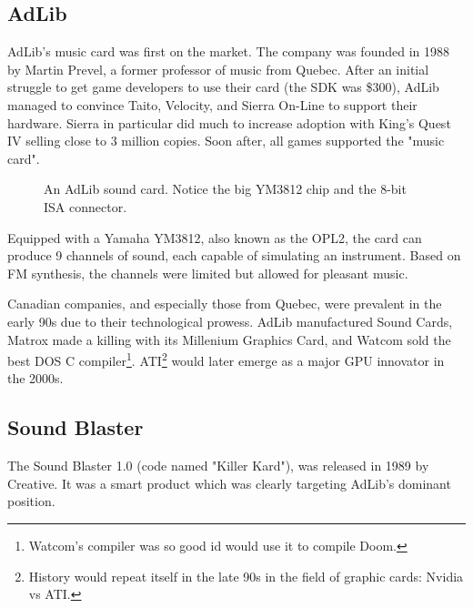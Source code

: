 \documentclass[book.tex]{subfiles}
\begin{document}
  \subsection{AdLib}
  AdLib's music card was first on the market. The company was founded in 1988 by Martin Prevel, a former professor of music from Quebec. After an initial struggle to get game developers to use their card (the SDK was \$300), AdLib managed to convince Taito, Velocity, and Sierra On-Line to support their hardware. Sierra in particular did much to increase adoption with King's Quest IV selling close to 3 million copies. Soon after, all games supported the "music card".\\
  \par

  \begin{figure}[H] 
    \centering 
    \caption{An AdLib sound card. Notice the big YM3812 chip and the 8-bit ISA connector.}
  \end{figure}
   \par
      Equipped with a Yamaha YM3812, also known as the OPL2, the card can produce 9 channels of sound, each capable of simulating an instrument. Based on FM synthesis, the channels were limited but allowed for pleasant music.\\
\par
{} Canadian companies, and especially those from Quebec, were prevalent in the early 90s due to their technological prowess. AdLib manufactured Sound Cards, Matrox made a killing with its Millenium Graphics Card, and Watcom sold the best DOS C compiler\footnote{Watcom's compiler was so good id would use it to compile Doom.}. ATI\footnote{History would repeat itself in the late 90s in the field of graphic cards: Nvidia vs ATI.} would later emerge as a major GPU innovator in the 2000s.\\
  
  


  \subsection{Sound Blaster}
  The Sound Blaster 1.0 (code named "Killer Kard"), was released in 1989 by Creative. It was a smart product which was clearly targeting AdLib's dominant position.\\ 
\par
\end{document}

